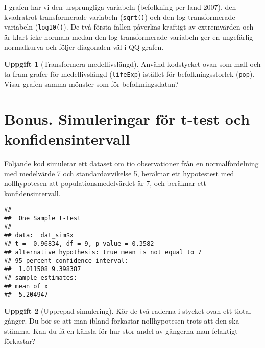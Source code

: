 \documentclass[
]{book}
\newenvironment{Shaded}{\begin{snugshade}}{\end{snugshade}}
\newcommand{\AttributeTok}[1]{\textcolor[rgb]{0.13,0.29,0.53}{#1}}
\newcommand{\DecValTok}[1]{\textcolor[rgb]{0.00,0.00,0.81}{#1}}
\newcommand{\FunctionTok}[1]{\textcolor[rgb]{0.13,0.29,0.53}{\textbf{#1}}}
\newcommand{\NormalTok}[1]{#1}
\newcommand{\OtherTok}[1]{\textcolor[rgb]{0.56,0.35,0.01}{#1}}
\newcommand{\SpecialCharTok}[1]{\textcolor[rgb]{0.81,0.36,0.00}{\textbf{#1}}}
\theoremstyle{definition}
\theoremstyle{definition}
\theoremstyle{definition}
\newtheorem{exercise}{Uppgift}[chapter]
\theoremstyle{definition}
\theoremstyle{remark}
\begin{document}
I grafen har vi den ursprungliga variabeln (befolkning per land 2007), den kvadratrot-transformerade variabeln (\texttt{sqrt()}) och den log-transformerade variabeln (\texttt{log10()}). De två första fallen påverkas kraftigt av extremvärden och är klart icke-normala medan den log-transformerade variabeln ger en ungefärlig normalkurva och följer diagonalen väl i QQ-grafen.

\begin{exercise}[Transformera medellivslängd]
Använd kodstycket ovan som mall och ta fram grafer för medellivslängd (\texttt{lifeExp}) istället för befolkningsstorlek (\texttt{pop}). Visar grafen samma mönster som för befolkningsdatan?
\end{exercise}

\hypertarget{bonus.-simuleringar-fuxf6r-t-test-och-konfidensintervall}{%
\section{Bonus. Simuleringar för t-test och konfidensintervall}\label{bonus.-simuleringar-fuxf6r-t-test-och-konfidensintervall}}

Följande kod simulerar ett dataset om tio observationer från en normalfördelning med medelvärde 7 och standardavvikelse 5, beräknar ett hypotestest med nollhypotesen att populationsmedelvärdet är 7, och beräknar ett konfidensintervall.

\begin{Shaded}
\end{Shaded}

\begin{verbatim}
## 
##  One Sample t-test
## 
## data:  dat_sim$x
## t = -0.96834, df = 9, p-value = 0.3582
## alternative hypothesis: true mean is not equal to 7
## 95 percent confidence interval:
##  1.011508 9.398387
## sample estimates:
## mean of x 
##  5.204947
\end{verbatim}

\begin{exercise}[Upprepad simulering]
Kör de två raderna i stycket ovan ett tiotal gånger. Du bör se att man ibland förkastar nollhypotesen trots att den ska stämma. Kan du få en känsla för hur stor andel av gångerna man felaktigt förkastar?
\end{exercise}
\end{document}

